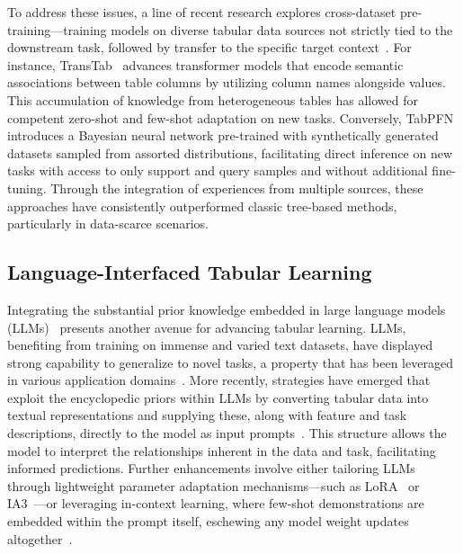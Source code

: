 To address these issues, a line of recent research explores cross-dataset pre-training—training models on diverse tabular data sources not strictly tied to the downstream task, followed by transfer to the specific target context~\cite{zhang2023generative,levin2022transfer,zhu2023xtab}. For instance, TransTab~\cite{wang2022transtab} advances transformer models that encode semantic associations between table columns by utilizing column names alongside values. This accumulation of knowledge from heterogeneous tables has allowed for competent zero-shot and few-shot adaptation on new tasks. Conversely, TabPFN~\cite{hollmann2022tabpfn} introduces a Bayesian neural network pre-trained with synthetically generated datasets sampled from assorted distributions, facilitating direct inference on new tasks with access to only support and query samples and without additional fine-tuning. Through the integration of experiences from multiple sources, these approaches have consistently outperformed classic tree-based methods, particularly in data-scarce scenarios.

\subsection{Language-Interfaced Tabular Learning} Integrating the substantial prior knowledge embedded in large language models (LLMs)~\cite{anil2023palm,openai2023gpt4} presents another avenue for advancing tabular learning. LLMs, benefiting from training on immense and varied text datasets, have displayed strong capability to generalize to novel tasks, a property that has been leveraged in various application domains~\cite{brown2020language}. More recently, strategies have emerged that exploit the encyclopedic priors within LLMs by converting tabular data into textual representations and supplying these, along with feature and task descriptions, directly to the model as input prompts~\cite{dinh2022lift,hegselmann2023tabllm,wang2023anypredict}. This structure allows the model to interpret the relationships inherent in the data and task, facilitating informed predictions. Further enhancements involve either tailoring LLMs through lightweight parameter adaptation mechanisms—such as LoRA~\cite{hu2021lora} or IA3~\cite{liu2022few}—or leveraging in-context learning, where few-shot demonstrations are embedded within the prompt itself, eschewing any model weight updates altogether~\cite{dinh2022lift,hegselmann2023tabllm,nam2023semi,slack2023tablet}.

